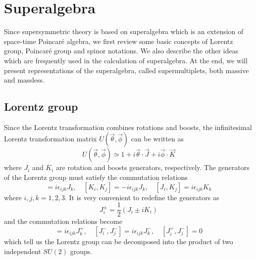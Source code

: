 \documentclass[12pt]{report}
\begin{document}
\chapter{Superalgebra}
Since supersymmetric theory is based on superalgebra which is an extension of space-time Poincar\'{e} algebra, we first review some basic concepts of Lorentz group, Poincar\'{e} group and spinor notations.
We also describe the other ideas which are frequently used in the calculation of superalgebra.
At the end, we will present representations of the superalgebra, called supermultiplets, both massive and massless. 



\section{Lorentz group}
Since the Lorentz transformation combines rotations and boosts, the infinitesimal Lorentz transformation matrix $U(\vec{\theta}, \vec{\phi}) $ can be written as
\begin{equation}
U(\vec{\theta}, \vec{\phi}) \simeq 1  + i \vec{\theta} \cdot \vec{J} + i \vec{\phi} \cdot \vec{K}
\end{equation}
where $J_{i}$ and $K_{i}$ are rotation and boosts generators, respectively.
The generators of the Lorentz group must satisfy the commutation relations
\begin{equation}
[J_{i}, J_{j}] = i \epsilon_{ijk} J_{k}, \quad
 [K_{i}, K_{j}] = -i \epsilon_{ijk} J_{k}, \quad 
 [J_{i}, K_{j}] = i \epsilon_{ijk} K_{k}
\end{equation}
where $i, j, k = 1, 2, 3$.
It is very convenient to redefine the generators as
\begin{equation}
J^{\pm}_{i} = \frac{1}{2} (J_{i} \pm i K_{i})
\end{equation}
and the commutation relations become
\begin{equation}
[J^{+}_{i}, J^{+}_{j}] = i \epsilon_{ijk} J^{+}_{k}, \quad 
[J^{-}_{i}, J^{-}_{j}] = i \epsilon_{ijk} J^{-}_{k}, \quad 
[J^{+}_{i}, J^{-}_{j}] = 0
\end{equation}
which tell us the Lorentz group can be decomposed into the product of two independent $SU(2)$ groups.
\end{document}
